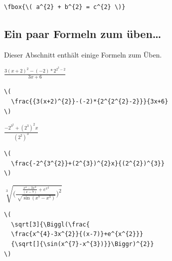 \documentclass[a4paper,10pt,twoside]{scrbook}
\begin{document}
\begin{minipage}[c]{.38\textwidth}
\setlength{\parskip}{1em}
\centering
{}
\end{minipage}
\hfill
\begin{minipage}[c]{.6\textwidth}
\setlength{\parskip}{1em}
\begin{lstlisting}[label=fboxbeispiel, style=customlatex]
\fbox{\( a^{2} + b^{2} = c^{2} \)}
\end{lstlisting}
\end{minipage}


\subsection{Ein paar Formeln zum üben\dots}


Dieser Abschnitt enthält einige Formeln zum Üben. 

\begin{minipage}[c]{.38\textwidth}
\setlength{\parskip}{1em}
\centering
\(
  \frac{{3(x+2)^{2}}-(-2)*{2^{2^{2}-2}}}{3x+6} 
\)
\end{minipage}
\hfill
\begin{minipage}[c]{.6\textwidth}
\setlength{\parskip}{1em}
\begin{lstlisting}[label=formelbeispiel1, style=customlatex]
\(
  \frac{{3(x+2)^{2}}-(-2)*{2^{2^{2}-2}}}{3x+6} 
\)
\end{lstlisting}
\end{minipage}

\begin{minipage}[c]{.38\textwidth}
\setlength{\parskip}{1em}
\centering
\(
  \frac{-2^{3^{2}}+(2^{3})^{2}x}{(2^{2})^{3}} 
\)
\end{minipage}
\hfill
\begin{minipage}[c]{.6\textwidth}
\setlength{\parskip}{1em}
\begin{lstlisting}[label=formelbeispiel2, style=customlatex]
\(
  \frac{-2^{3^{2}}+(2^{3})^{2}x}{(2^{2})^{3}} 
\)
\end{lstlisting}
\end{minipage}

\begin{minipage}[c]{.38\textwidth}
\setlength{\parskip}{1em}
\centering
\(
  \sqrt[3]{\Biggl(\frac{
  \frac{x^{4}-3x^{2}}{(x-7)}+e^{x^{2}}} 
  {\sqrt[]{\sin(x^{7}-x^{3})}}\Biggr)^{2}} 
\)
\end{minipage}
\hfill
\begin{minipage}[c]{.6\textwidth}
\setlength{\parskip}{1em}
\begin{lstlisting}[label=formelbeispiel3, style=customlatex]
\(
  \sqrt[3]{\Biggl(\frac{
  \frac{x^{4}-3x^{2}}{(x-7)}+e^{x^{2}}} 
  {\sqrt[]{\sin(x^{7}-x^{3})}}\Biggr)^{2}} 
\)
\end{lstlisting}
\end{minipage}
\end{document}
